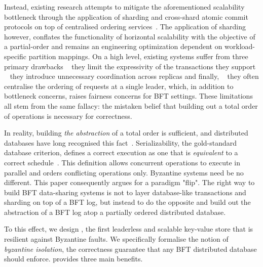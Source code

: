 Instead, existing research attempts to mitigate the aforementioned scalability bottleneck through the application of sharding and cross-shard atomic commit protocols on top of centralised ordering services~\cite{kokoris2018omniledger,al2017chainspace,padilha2016callinicos}. The application of sharding however, conflates the functionality of horizontal scalability with the objective of a partial-order and remains an engineering optimization dependent on workload-specific partition mappings.
On a high level, existing systems suffer from three primary drawbacks \one ~ they limit the expressivity of the transactions they support  \two ~ they introduce unnecessary coordination across replicas and finally,
\three ~ they often centralise the ordering of requests at a single leader, which, in addition to bottleneck concerns, raises fairness concerns for BFT settings. These limitations all stem from the same fallacy: the mistaken belief that building out a total order of operations is necessary for correctness. 
\fi



 
In reality, building \textit{the abstraction} of a total order is sufficient, and distributed databases have long recognised this fact~\cite{crooks2018obladi,bernstein1979fas,Papadimitriou1979serializability,adya99weakconsis}.  Serializability, the gold-standard database criterion, defines a correct execution as one that is \textit{equivalent} to a correct schedule~\cite{bernstein1979fas,Papadimitriou1979serializability,bernstein1979fas}. This definition allows concurrent operations to execute in parallel and orders conflicting operations only.  Byzantine systems need be no different. This paper consequently argues for a paradigm "flip". The
right way to build BFT data-sharing systems is not to layer database-like transactions and sharding on top of a BFT log, but instead to do the opposite and build out the abstraction of a BFT log atop a partially ordered distributed database.

To this effect, we design \sys{}, the first leaderless and scalable key-value store that is resilient against
Byzantine faults. We specifically formalise the notion of \textit{byzantine isolation}, the correctness
guarantee that any BFT distributed database should enforce.  \sys{} provides three main benefits.


